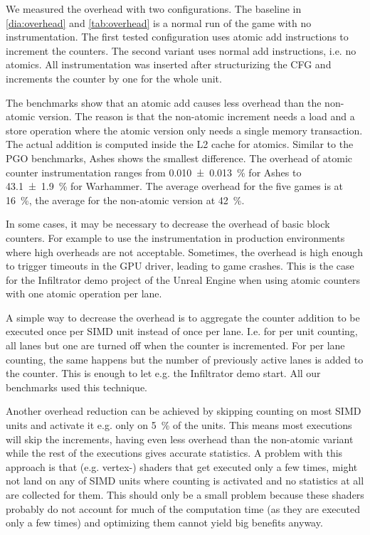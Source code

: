 We measured the overhead with two configurations.
The baseline in \cref{dia:overhead} and \cref{tab:overhead} is a normal run of the game with no instrumentation.
The first tested configuration uses atomic add instructions to increment the counters.
The second variant uses normal add instructions, i.e. no atomics.
All instrumentation was inserted after structurizing the CFG and increments the counter by one for the whole unit.


\begin{table}
	\centering
	\label{tab:overhead}
\end{table}

The benchmarks show that an atomic add causes less overhead than the non-atomic version.
The reason is that the non-atomic increment needs a load and a store operation where the atomic version only needs a single memory transaction. The actual addition is computed inside the L2 cache for atomics.
Similar to the PGO benchmarks, Ashes shows the smallest difference.
The overhead of atomic counter instrumentation ranges from \SI{0.010 \pm 0.013}{\percent} for Ashes to \SI{43.1 \pm 1.9}{\percent} for Warhammer.
The average overhead for the five games is at \SI{16}{\percent}, the average for the non-atomic version at \SI{42}{\percent}.

In some cases, it may be necessary to decrease the overhead of basic block counters. For example to use the instrumentation in production environments where high overheads are not acceptable.
Sometimes, the overhead is high enough to trigger timeouts in the GPU driver, leading to game crashes. This is the case for the Infiltrator demo project of the Unreal Engine when using atomic counters with one atomic operation per lane.

A simple way to decrease the overhead is to aggregate the counter addition to be executed once per SIMD unit instead of once per lane.
I.e. for per unit counting, all lanes but one are turned off when the counter is incremented.
For per lane counting, the same happens but the number of previously active lanes is added to the counter.
This is enough to let e.g. the Infiltrator demo start.
All our benchmarks used this technique.

Another overhead reduction can be achieved by skipping counting on most SIMD units and activate it e.g. only on \SI{5}{\percent} of the units.
This means most executions will skip the increments, having even less overhead than the non-atomic variant while the rest of the executions gives accurate statistics.
A problem with this approach is that (e.g. vertex-) shaders that get executed only a few times, might not land on any of SIMD units where counting is activated and no statistics at all are collected for them.
This should only be a small problem because these shaders probably do not account for much of the computation time (as they are executed only a few times) and optimizing them cannot yield big benefits anyway.

